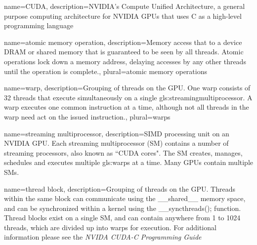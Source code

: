 \makeglossaries








{
  name=CUDA,
  description={NVIDIA's Compute Unified Architecture,
				 a general purpose computing architecture for NVIDIA GPUs that uses C as a high-level programming language}
}

{
  name=atomic memory operation,
  description={Memory access that to a device DRAM or shared memory that is guaranteed to be seen by all threads. Atomic operations lock down a memory address, delaying accesses by any other threads until the operation is complete.},
	plural=atomic memory operations
}

{
  name=warp,
  description={Grouping of threads on the GPU. One warp consists of 32 threads that execute simultaneously on a single \gls{gls:streamingmultiprocessor}. A warp executes one common instruction at a time, although not all threads in the warp need act on the issued instruction.},
	plural=warps
}

{
  name=streaming multiprocessor,
  description={SIMD processing unit on an NVIDIA GPU. Each streaming multiprocessor (SM) contains a number of streaming processors, also known as ``CUDA cores". The SM creates, manages, schedules and executes multiple \glspl{gls:warp} at a time. Many GPUs contain multiple SMs.\cite{NVIDIACorporation2011} }
}

{
  name=thread block,
  description={Grouping of threads on the GPU. Threads within the same block can communicate using the \_\_shared\_\_ memory space, and can be synchronized within a kernel using the \_\_syncthreads(); function. Thread blocks exist on a single SM, and can contain anywhere from 1 to 1024 threads, which are divided up into warps for execution. For additional information please see the \emph{NVIDA CUDA-C Programming Guide}\cite{NVIDIACorporation2011} }
}


